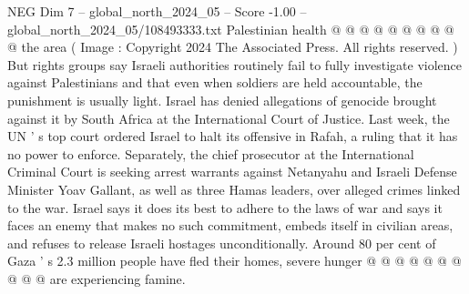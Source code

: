 \begin{textsample}{NEG Dim 7 – global\_north\_2024\_05 – Score -1.00 – global\_north\_2024\_05/108493333.txt}
Palestinian health @ @ @ @ @ @ @ @ @ @ the area ( Image : Copyright 2024 The Associated Press.
All rights reserved. ) But rights groups say Israeli authorities routinely fail to fully investigate violence against Palestinians and that even when soldiers are held accountable, the punishment is usually light.
Israel has denied allegations of genocide brought against it by South Africa at the International Court of Justice.
Last week, the UN ' s top court ordered Israel to halt its offensive in Rafah, a ruling that it has no power to enforce.
Separately, the chief prosecutor at the International Criminal Court is seeking arrest warrants against Netanyahu and Israeli Defense Minister Yoav Gallant, as well as three Hamas leaders, over alleged crimes linked to the war.
Israel says it does its best to adhere to the laws of war and says it faces an enemy that makes no such commitment, embeds itself in civilian areas, and refuses to release Israeli hostages unconditionally.
Around 80 per cent of Gaza ' s 2.3 million people have fled their homes, severe hunger @ @ @ @ @ @ @ @ @ @ are experiencing famine.

\end{textsample}
